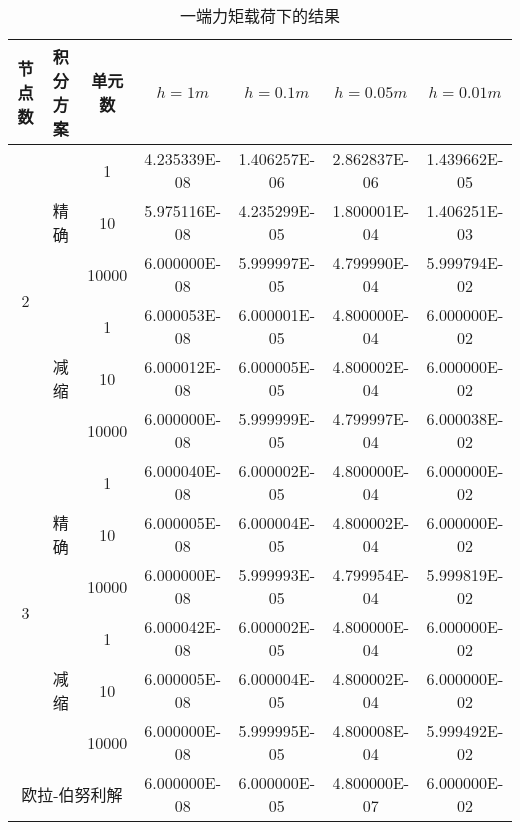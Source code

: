 \documentclass[UTF8,c5size]{ctexart}
\begin{document}
\begin{table*}[htbp]
    \begin{center}
        \caption{一端力矩载荷下的结果}
        \label{表2}
        \begin{tabular}{|c|c|c|c|c|c|c|}
            \hline
            节点数&积分方案&单元数&$h=1m$&$h=0.1m$&$h=0.05m$&$h=0.01m$\\
            \hline
            \multirow{6}{*}{2}&\multirow{3}{*}{精确}&
            1&4.235339E-08&1.406257E-06&2.862837E-06&1.439662E-05\\
            \cline{3-7}
            &&
            10&5.975116E-08&4.235299E-05&1.800001E-04&1.406251E-03\\
            \cline{3-7}
            &&
            10000&6.000000E-08&5.999997E-05&4.799990E-04&5.999794E-02\\
            \cline{2-7}
            &\multirow{3}{*}{减缩}&
            1&6.000053E-08&6.000001E-05&4.800000E-04&6.000000E-02\\
            \cline{3-7}
            &&
            10&6.000012E-08&6.000005E-05&4.800002E-04&6.000000E-02\\
            \cline{3-7}
            &&
            10000&6.000000E-08&5.999999E-05&4.799997E-04&6.000038E-02\\
            \hline
    
            \multirow{6}{*}{3}&\multirow{3}{*}{精确}&
            1&6.000040E-08&6.000002E-05&4.800000E-04&6.000000E-02\\
            \cline{3-7}
            &&
            10&6.000005E-08&6.000004E-05&4.800002E-04&6.000000E-02\\
            \cline{3-7}
            &&
            10000&6.000000E-08&5.999993E-05&4.799954E-04&5.999819E-02\\
            \cline{2-7}
            &\multirow{3}{*}{减缩}&
            1&6.000042E-08&6.000002E-05&4.800000E-04&6.000000E-02\\
            \cline{3-7}
            &&
            10&6.000005E-08&6.000004E-05&4.800002E-04&6.000000E-02\\
            \cline{3-7}
            &&
            10000&6.000000E-08&5.999995E-05&4.800008E-04&5.999492E-02\\
            \hline
    
            \multicolumn{3}{|c|}{欧拉-伯努利解}
            &6.000000E-08&6.000000E-05&4.800000E-07&6.000000E-02\\
            \hline
    
        \end{tabular}
    \end{center}
\end{table*}
\end{document}
